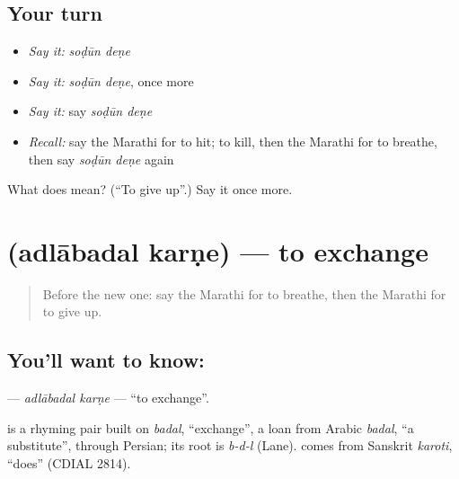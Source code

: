 \subsection*{Your turn}
\begin{itemize}
\raggedright
  \item \emph{Say it:} \emph{soḍūn deṇe}
  \item \emph{Say it:} \emph{soḍūn deṇe}, once more
  \item \emph{Say it:} say \emph{soḍūn deṇe}
  \item \emph{Recall:} say the Marathi for to hit; to kill, then the Marathi for to breathe, then say \emph{soḍūn deṇe} again
\end{itemize}

\begin{tcolorbox}[breakable,colback=teal!4,colframe=teal!35!black,title={Before you move on}]
What does   mean? (\textquotedblleft{}To give up\textquotedblright{}.) Say it once more.
\end{tcolorbox}
\section[\texorpdfstring{\mr{अदलाबदल} \mr{करणे} (adlābadal karṇe)}{अदलाबदल करणे (adlābadal karṇe)}]{  (adlābadal karṇe) — to exchange}

\label{lesson:MR-C167-adlabadal-karne}



\begin{quote}
Before the new one: say the Marathi for to breathe, then the Marathi for to give up.
\end{quote}

\subsection*{You'll want to know:  }
\textbf{ } — \emph{adlābadal karṇe} — \textquotedblleft{}to exchange\textquotedblright{}.

\begin{cousinweb}
\textbf{} is a rhyming pair built on \emph{badal}, \textquotedblleft{}exchange\textquotedblright{}, a loan from Arabic \emph{badal}, \textquotedblleft{}a substitute\textquotedblright{}, through Persian; its root is \emph{b-d-l} (Lane). \textbf{} comes from Sanskrit \emph{karoti}, \textquotedblleft{}does\textquotedblright{} (CDIAL 2814).
\end{cousinweb}


